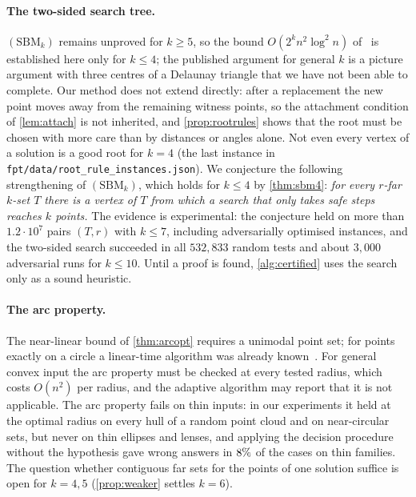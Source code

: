 \documentclass[11pt,a4paper]{article}
\theoremstyle{definition}
\theoremstyle{remark}
\newcommand{\code}[1]{\nolinkurl{#1}}
\begin{document}
\paragraph{The two-sided search tree.}
$(\mathrm{SBM}_k)$ remains unproved for $k\ge5$, so the bound
$O(2^kn^2\log^2n)$ of~\cite{sbm} is established here only for $k\le4$; the
published argument for general $k$ is a picture argument with three centres of
a Delaunay triangle that we have not been able to complete. Our method does not
extend directly: after a replacement the new point moves away from the
remaining witness points, so the attachment condition of \cref{lem:attach} is
not inherited, and \cref{prop:rootrules} shows that the root must be chosen
with more care than by distances or angles alone. Not even every vertex of a
solution is a good root for $k=4$ (the last instance in
\code{fpt/data/root\_rule\_instances.json}). We conjecture the following
strengthening of $(\mathrm{SBM}_k)$, which holds for $k\le4$ by
\cref{thm:sbm4}: \emph{for every $r$-far $k$-set $T$ there is a vertex of $T$
from which a search that only takes safe steps reaches $k$ points.} The
evidence is experimental: the conjecture held on more than $1.2\cdot10^7$
pairs $(T,r)$ with $k\le7$, including adversarially optimised instances, and
the two-sided search succeeded in all $532{,}833$ random tests and about
$3{,}000$ adversarial runs for $k\le10$. Until a proof is found,
\cref{alg:certified} uses the search only as a sound heuristic.

\paragraph{The arc property.}
The near-linear bound of \cref{thm:arcopt} requires a unimodal point set; for
points exactly on a circle a linear-time algorithm was already
known~\cite{akagi}. For general convex input the arc property must be checked
at every tested radius, which costs $O(n^2)$ per radius, and the adaptive
algorithm may report that it is not applicable. The arc property fails on thin
inputs: in our experiments it held at the optimal radius on every hull of a
random point cloud and on near-circular sets, but never on thin ellipses and
lenses, and applying the decision procedure without the hypothesis gave wrong
answers in $8\%$ of the cases on thin families. The question
whether contiguous far sets for the points of one solution suffice is open for
$k=4,5$ (\cref{prop:weaker} settles $k=6$).
\end{document}
